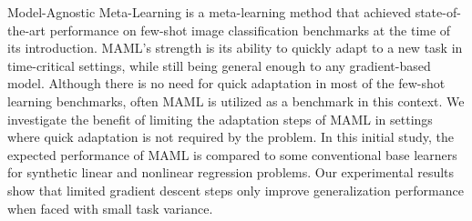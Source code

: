 Model-Agnostic Meta-Learning is a meta-learning method that achieved state-of-the-art performance on few-shot image classification benchmarks at the time of its introduction. MAML's strength is its ability to quickly adapt to a new task in time-critical settings, while still being general enough to any gradient-based model. Although there is no need for quick adaptation in most of the few-shot learning benchmarks, often MAML is utilized as a benchmark in this context. We investigate the benefit of limiting the adaptation steps of MAML in settings where quick adaptation is not required by the problem. In this initial study, the expected performance of MAML is compared to some conventional base learners for synthetic linear and nonlinear regression problems. Our experimental results show that limited gradient descent steps only improve generalization performance when faced with small task variance. 
